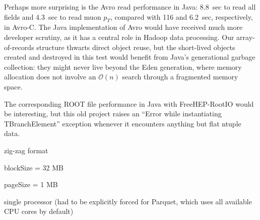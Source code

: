 \documentclass{article}
\begin{document}
Perhaps more surprising is the Avro read performance in Java: 8.8~sec to read all fields and 4.3~sec to read muon $p_T$, compared with 116 and 6.2~sec, respectively, in Avro-C. The Java implementation of Avro would have received much more developer scrutiny, as it has a central role in Hadoop data processing. Our array-of-records structure thwarts direct object reuse, but the short-lived objects created and destroyed in this test would benefit from Java's generational garbage collection: they might never live beyond the Eden generation, where memory allocation does not involve an $\mathcal{O}(n)$ search through a fragmented memory space.

The corresponding ROOT file performance in Java with FreeHEP-RootIO would be interesting, but this old project raises an ``Error while instantiating TBranchElement'' exception whenever it encounters anything but flat ntuple data.







\pagebreak

zig-zag format



blockSize = 32 MB

pageSize = 1 MB



single processor (had to be explicitly forced for Parquet, which uses all available CPU cores by default)
\end{document}
